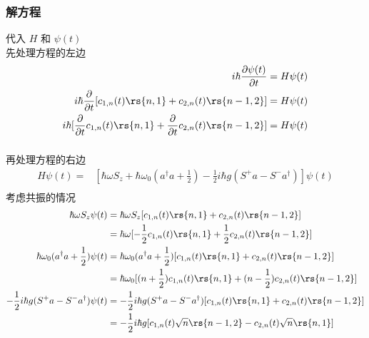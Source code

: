     \begin{frame} 
    \frametitle{解方程}
    代入 $H$ 和 $\psi(t)$\\  
    先处理方程的左边 
  \[ \begin{aligned}
    i \hbar \frac{\partial \psi(t)}{\partial t} & = H \psi(t)  \\
    i \hbar \frac{\partial }{\partial t} [c_{1,n}(t) \rs{n, 1} + c_{2,n}(t) \rs{n-1, 2}]& = H \psi(t)  \\
    i \hbar [\frac{\partial }{\partial t}c_{1,n}(t) \rs{n, 1} + \frac{\partial }{\partial t}c_{2,n}(t) \rs{n-1, 2}]& = H \psi(t)
  \end{aligned}\]      
    \end{frame}

    \begin{frame} 
    \frametitle{}
         再处理方程的右边
         \[ \begin{aligned}
            H \psi(t)= &[\hbar \omega S_z + \hbar \omega_0 (a^{\dagger}  a +\frac{1}{2}) - \frac{1}{2} i\hbar g (S^{+} a - S^{-} a ^{\dagger}  )] \psi(t) \\
          \end{aligned}\] 
        考虑共振的情况
        \[ \begin{aligned}
            \hbar \omega S_z \psi(t) &= \hbar \omega S_z [c_{1,n}(t) \rs{n, 1} + c_{2,n}(t) \rs{n-1, 2}] \\ 
            &= \hbar \omega [ -\frac{1}{2}c_{1,n}(t) \rs{n, 1} + \frac{1}{2}c_{2,n}(t) \rs{n-1, 2}] \\
           \hbar \omega_0 (a^{\dagger}  a +\frac{1}{2}) \psi(t) 
           &= \hbar \omega_0 (a^{\dagger}  a +\frac{1}{2}) [c_{1,n}(t) \rs{n, 1} + c_{2,n}(t) \rs{n-1, 2}] \\ 
        &=\hbar \omega_0 [ (n +\frac{1}{2})c_{1,n}(t) \rs{n, 1} + (n -\frac{1}{2})c_{2,n}(t) \rs{n-1, 2}]  \\ 
        - \frac{1}{2} i\hbar g (S^{+} a - S^{-} a ^{\dagger}  ) \psi(t) &= - \frac{1}{2} i\hbar g (S^{+} a - S^{-} a ^{\dagger}  )[c_{1,n}(t) \rs{n, 1} + c_{2,n}(t) \rs{n-1, 2}] \\ 
        &= - \frac{1}{2} i\hbar g [c_{1,n}(t) \sqrt{n} \rs{n-1, 2} - c_{2,n}(t) \sqrt{n} \rs{n, 1}] 
          \end{aligned}\]
    \end{frame}


